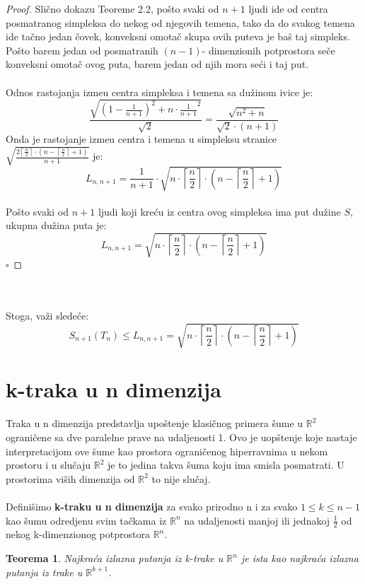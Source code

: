\documentclass[11pt,letter]{article}
\newtheorem{teo}{\bf Teorema}[section]
\begin{document}
\begin{proof}
Sli\v cno dokazu Teoreme 2.2, po\v sto svaki od $n+1$ ljudi ide od centra posmatranog simpleksa do nekog od njegovih temena, tako da do svakog temena ide ta\v cno jedan \v covek, konveksni omota\v c skupa ovih puteva je ba\v s taj simpleks. Po\v sto barem jedan od posmatranih $(n-1)$- dimenzionih potprostora se\v ce konveksni omota\v c ovog puta, barem jedan od njih mora se\' ci i taj put. 
\\
\\
\indent Odnos rastojanja izme\dj u centra simpleksa i temena sa du\v zinom ivice je:
$$\frac{\sqrt{\left( 1-\frac{1}{n+1}\right)^2+n\cdot{\frac{1}{n+1}}^2}}{\sqrt2}=\frac{\sqrt{n^2+n}}{\sqrt2 \cdot(n+1)}$$
\indent Onda je rastojanje izme\dj u centra i temena u simpleksu stranice  $\sqrt{\frac{2\left\lceil \frac{n}{2}\right\rceil\cdot \left( n-\left\lceil\frac{n}{2}\right\rceil+1\right)}{n+1}}$ je:
\\
$$L_{n,n+1}=\frac{1}{n+1}\cdot\sqrt{n\cdot\left\lceil\frac{n}{2}\right\rceil\cdot\left( n-\left\lceil\frac{n}{2}\right\rceil+1\right)}$$
\\
\indent Po\v sto svaki od $n+1$ ljudi koji kre\' cu iz centra ovog simpleksa ima put du\v zine $S$, ukupna du\v zina puta je:
\\
$$L_{n,n+1}=\sqrt{n\cdot\left\lceil\frac{n}{2}\right\rceil\cdot\left( n-\left\lceil\frac{n}{2}\right\rceil +1\right)}$$
$\square$
\end{proof}
\\
\\
\indent Stoga, va\v zi slede\' ce:
$$S_{n+1}(T_n)\leqslant L_{n,n+1}= \sqrt{n\cdot\left\lceil\frac{n}{2}\right\rceil\cdot\left( n-\left\lceil\frac{n}{2}\right\rceil +1\right)}$$

\section[k-traka u n dimenzija]{k-traka u n dimenzija}
\bigskip
\indent Traka u n dimenzija predstavlja upo\v stenje klasi\v cnog primera \v sume u $\mathbb{R}^2$ ograni\v cene sa dve paralelne prave na udaljenosti 1. Ovo je uop\v stenje koje nastaje interpretacijom ove \v sume kao prostora ograni\v cenog hiperravnima u nekom prostoru i u slu\v caju $\mathbb{R}^2$ je to jedina takva \v suma koju ima smisla posmatrati. U prostorima vi\v sih dimenzija od $\mathbb{R}^2$ to nije slu\v caj.
\\
\smallskip
\\
\indent Defini\v simo \textbf{k-traku u n dimenzija} za svako prirodno n i za svako $1\leqslant k\leqslant n-1$  kao \v sumu odredjenu svim ta\v ckama iz $\mathbb{R}^n$ na udaljenosti manjoj ili jednakoj $\frac{1}{2}$ od nekog k-dimenzionog potprostora $\mathbb{R}^n$. 
\\
\begin{teo} Najkra\' ca izlazna putanja iz k-trake u $\mathbb{R}^n$ je ista kao najkra\' ca izlazna putanja iz trake u $\mathbb{R}^{k+1}$.\end{teo}
\end{document}
